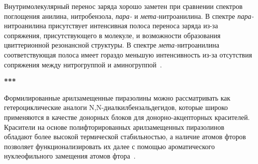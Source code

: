 Внутримолекулярный перенос заряда хорошо заметен при сравнении спектров поглощения анилина, нитробензола, \emph{пара-} и \emph{мета-}нитроанилина.
В спектре \emph{пара-}нитроанилина присутствует интенсивная полоса переноса заряда из-за сопряжения, присутствующего в молекуле, и возможности образования цвиттерионной резонансной структуры.
В спектре \emph{мета-}нитроанилина соответствующая полоса имеет гораздо меньшую интенсивность из-за отсутствия сопряжения между нитрогруппой и аминогруппой~\cite{Bures2014a}.



\FloatBarrier{}
\begin{center}
    \LARGE
    \textbf{***}
\end{center}

Формилированные арилзамещенные пиразолины можно рассматривать как гетероциклические аналоги N,N-диалкилбензальдегидов, которые широко применяются в качестве донорных блоков для донорно-акцепторных красителей.
Красители на основе полифторированных арилзамещенных пиразолинов обладают более высокой термической стабильностью, а наличие атомов фторов позволяет функционализировать их далее с помощью ароматического нуклеофильного замещения атомов фтора~\cite{2019}.

